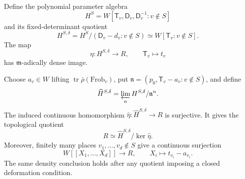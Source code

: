 \begin{theorem}
\label{v4-arith:w10-e:thm:bc-bernstein-galois}
Define the polynomial parameter algebra
\[
 H^S=W[\mathsf T_v,\mathsf D_v,\mathsf D_v^{-1}:v\notin S]
\]
and its fixed-determinant quotient
\[
 H^{S,\delta}=H^S/(\mathsf D_v-d_v:v\notin S)
 \simeq W[\mathsf T_v:v\notin S].
\]
The map
\[
 \eta:H^{S,\delta}\longrightarrow R,\qquad
 \mathsf T_v\longmapsto t_v
\]
has $\mathfrak m$-adically dense image.

Choose $a_v\in W$ lifting $\operatorname{tr}\bar\rho(\mathrm{Frob}_v)$,
put $\mathfrak n=(p_0,\mathsf T_v-a_v:v\notin S)$, and define
\[
 \widehat H^{S,\delta}
 =\varprojlim_n H^{S,\delta}/\mathfrak n^n.
\]
The induced continuous homomorphism
$\widehat\eta:\widehat H^{S,\delta}\to R$ is surjective.
It gives the topological quotient
\begin{equation}
\label{v4-arith:w10-e:eq:bc-global}
 R\simeq\widehat H^{S,\delta}/\ker\widehat\eta.
\end{equation}
Moreover, finitely many places $v_1,\ldots,v_d\notin S$ give a
continuous surjection
\[
 W[[X_1,\ldots,X_d]]\longrightarrow R,\qquad
 X_i\longmapsto t_{v_i}-a_{v_i}.
\]
The same density conclusion holds after any quotient imposing a
closed deformation condition.
\end{theorem}

